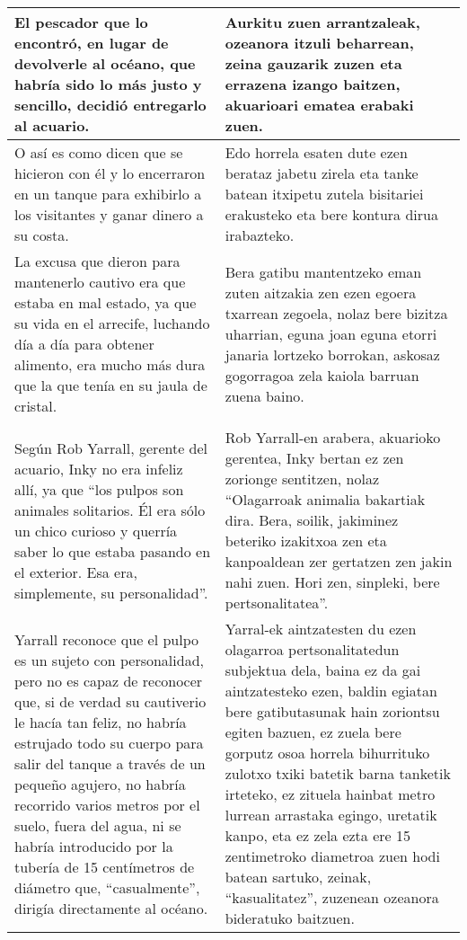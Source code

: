 \documentclass{article}
\begin{document}
\begin{center}
\begin{longtable}{|p{6cm}|p{6cm}|}
  \midrule
  El pescador que lo encontró, en lugar de devolverle al océano, que habría sido lo más justo y sencillo, decidió entregarlo al acuario.&
  Aurkitu zuen arrantzaleak, ozeanora itzuli beharrean, zeina gauzarik zuzen eta errazena izango baitzen, akuarioari ematea erabaki zuen.\\

  \midrule
  O así es como dicen que se hicieron con él y lo encerraron en un tanque para exhibirlo a los visitantes y ganar dinero a su costa.&
  Edo horrela esaten dute ezen berataz jabetu zirela eta tanke batean itxipetu zutela bisitariei erakusteko eta bere kontura dirua irabazteko.\\

  \midrule
  La excusa que dieron para mantenerlo cautivo era que estaba en mal estado, ya que su vida en el arrecife, luchando día a día para obtener alimento, era mucho más dura que la que tenía en su jaula de cristal.&
  Bera gatibu mantentzeko eman zuten aitzakia zen ezen egoera txarrean zegoela, nolaz bere bizitza uharrian, eguna joan eguna etorri janaria lortzeko borrokan, askosaz gogorragoa zela kaiola barruan zuena baino.\\

  \midrule
  \cellcolor{lightgray}{\textbf{Párrafo}} &
  \cellcolor{lightgray}{\textbf{Paragrafoa}}\\
  
  \midrule
  Según Rob Yarrall, gerente del acuario, Inky no era infeliz allí, ya que ``los pulpos son animales solitarios. Él era sólo un chico curioso y querría saber lo que estaba pasando en el exterior. Esa era, simplemente, su personalidad''.&
  Rob Yarrall-en arabera, akuarioko gerentea, Inky bertan ez zen zorionge sentitzen, nolaz ``Olagarroak animalia bakartiak dira. Bera, soilik, jakiminez beteriko izakitxoa zen eta kanpoaldean zer gertatzen zen jakin nahi zuen. Hori zen, sinpleki, bere pertsonalitatea''.\\

  \midrule
  Yarrall reconoce que el pulpo es un sujeto con personalidad, pero no es capaz de reconocer que, si de verdad su cautiverio le hacía tan feliz, no habría estrujado todo su cuerpo para salir del tanque a través de un pequeño agujero, no habría recorrido varios metros por el suelo, fuera del agua, ni se habría introducido por la tubería de 15 centímetros de diámetro que, ``casualmente'', dirigía directamente al océano.&
  Yarral-ek aintzatesten du ezen olagarroa pertsonalitatedun subjektua dela, baina ez da gai aintzatesteko ezen, baldin egiatan bere gatibutasunak hain zoriontsu egiten bazuen, ez zuela bere gorputz osoa horrela bihurrituko zulotxo txiki batetik barna tanketik irteteko, ez zituela hainbat metro lurrean arrastaka egingo, uretatik kanpo, eta ez zela ezta ere 15 zentimetroko diametroa zuen hodi batean sartuko, zeinak, ``kasualitatez'', zuzenean ozeanora bideratuko baitzuen.\\


\end{longtable}
\end{center}
\end{document}
